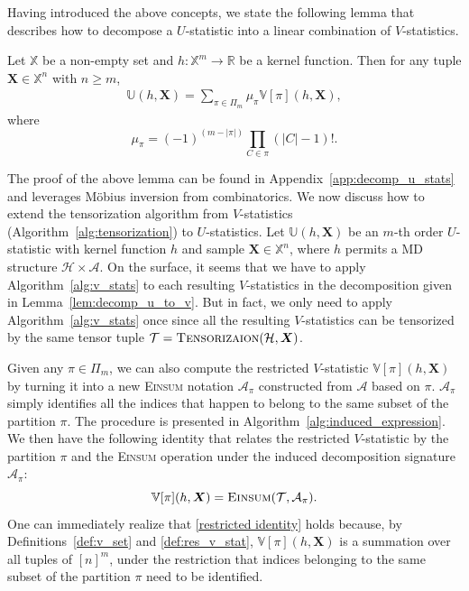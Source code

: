 \documentclass[twoside,11pt]{article}
\def\Einsum{\textsc{Einsum}}
\newcommand{\mobius}{M\"{o}bius}
\newcommand{\sPi}{\pi}
\newcommand{\ustat}{\mathbb{U}}
\newcommand{\vstat}{\mathbb{V}}
\newcommand{\ustatp}[2]{\ustat(#1,#2)}
\newcommand{\samplespace}{\bbX}
\newcommand{\partition}{\Pi}
\newcommand{\partitionp}[1]{\partition_{#1}}
\newcommand{\tensorcontraction}{\textsc{Einsum}}
\def\bbX{\mathbb{X}}
\def\bbR{\mathbb{R}}
\def\calA{\mathcal{A}}
\def\calT{\mathcal{T}}
\def\calH{\mathcal{H}}
\begin{document}
Having introduced the above concepts, we state the following lemma that describes how to decompose a $U$-statistic into a linear combination of $V$-statistics.

\begin{lemma}
\label{lem:decomp_u_to_v}
Let $\bbX$ be a non-empty set and $h: \bbX^{m} \rightarrow \bbR$ be a kernel function. Then for any tuple $\bm{X} \in \bbX^{n}$ with $n \geq m$,
\begin{align*}
    \ustat(h,\bm{X}) = \sum_{\sPi \in \partitionp{m}} 
    \mu_\sPi \vstat[\sPi](h, \bm{X}), 
\end{align*}
where
\begin{equation*}
    \mu_\sPi = (-1)^{(m-|\sPi|)} \prod_{C \in \sPi} (|C| - 1)!. 
\end{equation*}
\end{lemma}

The proof of the above lemma can be found in Appendix~\ref{app:decomp_u_stats} and leverages \mobius{} inversion from combinatorics. We now discuss how to extend the tensorization algorithm from $V$-statistics (Algorithm~\ref{alg:tensorization}) to $U$-statistics. Let $\ustatp{h}{\bm{X}}$ be an $m$-th order $U$-statistic with kernel function $h$ and sample $\bm{X} \in \samplespace^n$, where $h$ permits a MD structure $\calH \times \calA$. On the surface, it seems that we have to apply Algorithm~\ref{alg:v_stats} to each resulting $V$-statistics in the decomposition given in Lemma~\ref{lem:decomp_u_to_v}. But in fact, we only need to apply Algorithm~\ref{alg:v_stats} once since all the resulting $V$-statistics can be tensorized by the same tensor tuple $\calT = \textsc{Tensorizaion} (\calH, \bm{X})$. 

Given any $\pi \in \partitionp{m}$, we can also compute the restricted $V$-statistic $\vstat[\pi] (h, \bm{X})$ by turning it into a new \Einsum{} notation $\calA_{\pi}$ constructed from $\calA$ based on $\pi$. $\calA_{\pi}$ simply identifies all the indices that happen to belong to the same subset of the partition $\pi$. The procedure is presented in Algorithm~\ref{alg:induced_expression}. We then have the following identity that relates the restricted $V$-statistic by the partition $\sPi$ and the \Einsum{} operation under the induced decomposition signature $\calA_{\pi}$:
\begin{equation}
\label{restricted identity}
\vstat[\sPi](h, \bm{X}) =  \tensorcontraction(\calT, \calA_\sPi).
\end{equation}
One can immediately realize that \eqref{restricted identity} holds because, by Definitions~\ref{def:v_set} and \ref{def:res_v_stat}, $\vstat[\pi](h, \bm{X})$ is a summation over all tuples of $[n]^m$, under the restriction that indices belonging to the same subset of the partition $\pi$ need to be identified.
\end{document}
